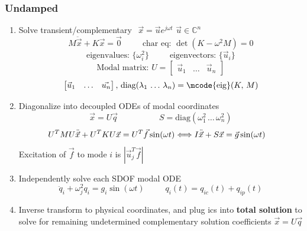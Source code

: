 \documentclass[twocolumn, 12pt]{article}    %
\begin{document}
\subsubsection*{Undamped}
\begin{enumerate}
    \item Solve transient/complementary \(\hspace{5pt} \vec{x} = \vec{u} e^{j\omega t}\) \hspace{5pt}\(\vec{u} \in \mathds{C}^n\)
    \begin{equation*}
        M\ddot{\Vec{x}} + K\Vec{x} = \Vec{0} \hspace{30pt} \text{char eq: } \det(K-\omega^2M) = 0 
    \end{equation*}
    \begin{equation*}
        \text{eigenvalues: } \{\omega_i^2\}  \hspace{30pt}  \text{eigenvectors: } \{\Vec{u}_i\} 
    \end{equation*}
    \begin{equation*}
        \text{Modal matrix: } U = \begin{bmatrix}
            \vec{u}_1 & \dots & \vec{u}_n
        \end{bmatrix} 
    \end{equation*}
    \begin{equation*}
        \begin{bmatrix}
            \vec{u}_1 & \dots & \vec{u_n}
        \end{bmatrix},\, \text{diag} (\lambda_1\, \dots \,\lambda_n) = \text{\mcode{eig}}(K,\, M)
    \end{equation*}

    \item Diagonalize into decoupled ODEs of modal coordinates
    \begin{equation*}
        \vec{x} = U\vec{q} \hspace{60pt} S = \text{diag} (\omega_1^2\, \dots\, \omega_n^2) 
    \end{equation*}
    \begin{equation*}
        \hspace{-10pt} U^TMU \ddot{\vec{x}} + U^TKU\vec{x} = U^T\vec{f}\sin(\omega t)
        \Longleftrightarrow I\ddot{\vec{x}} + S \vec{x} = \vec{g} \sin (\omega t)
    \end{equation*}
    Excitation of \(\vec{f}\) to mode \(i\) is \(|\vec{u}_j^T\vec{f}|\)

    \item Independently solve each SDOF modal ODE
    \begin{equation*}
        \ddot{q}_i  + \omega_j^2 q_i = g_i \sin (\omega t) \hspace{30pt} q_i(t) = q_{ic}(t) + q_{ip}(t)
    \end{equation*}

    \item Inverse transform to physical coordinates, and plug ics into \textbf{total solution} to solve for remaining undetermined complementary solution coefficients \(\vec{x} = U\vec{q}\)
\end{enumerate}
\end{document}
